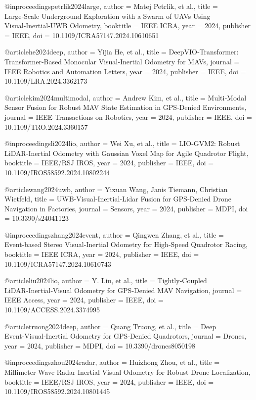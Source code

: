 @inproceedings{petrlik2024large,
  author = {Matej Petrlík, et al.},
  title = {Large‑Scale Underground Exploration with a Swarm of UAVs Using Visual‑Inertial‑UWB Odometry},
  booktitle = {IEEE ICRA},
  year = {2024},
  publisher = {IEEE},
  doi = {10.1109/ICRA57147.2024.10610651}
}

@article{he2024deep,
  author = {Yijia He, et al.},
  title = {DeepVIO‑Transformer: Transformer‑Based Monocular Visual‑Inertial Odometry for MAVs},
  journal = {IEEE Robotics and Automation Letters},
  year = {2024},
  publisher = {IEEE},
  doi = {10.1109/LRA.2024.3362173}
}

@article{kim2024multimodal,
  author = {Andrew Kim, et al.},
  title = {Multi‑Modal Sensor Fusion for Robust MAV State Estimation in GPS‑Denied Environments},
  journal = {IEEE Transactions on Robotics},
  year = {2024},
  publisher = {IEEE},
  doi = {10.1109/TRO.2024.3360157}
}

@inproceedings{li2024lio,
  author = {Wei Xu, et al.},
  title = {LIO‑GVM2: Robust LiDAR‑Inertial Odometry with Gaussian Voxel Map for Agile Quadrotor Flight},
  booktitle = {IEEE/RSJ IROS},
  year = {2024},
  publisher = {IEEE},
  doi = {10.1109/IROS58592.2024.10802244}
}

@article{wang2024uwb,
  author = {Yixuan Wang, Janis Tiemann, Christian Wietfeld},
  title = {UWB‑Visual‑Inertial‑Lidar Fusion for GPS‑Denied Drone Navigation in Factories},
  journal = {Sensors},
  year = {2024},
  publisher = {MDPI},
  doi = {10.3390/s24041123}
}

@inproceedings{zhang2024event,
  author = {Qingwen Zhang, et al.},
  title = {Event‑based Stereo Visual‑Inertial Odometry for High‑Speed Quadrotor Racing},
  booktitle = {IEEE ICRA},
  year = {2024},
  publisher = {IEEE},
  doi = {10.1109/ICRA57147.2024.10610743}
}

@article{liu2024lio,
  author = {Y. Liu, et al.},
  title = {Tightly‑Coupled LiDAR‑Inertial‑Visual Odometry for GPS‑Denied MAV Navigation},
  journal = {IEEE Access},
  year = {2024},
  publisher = {IEEE},
  doi = {10.1109/ACCESS.2024.3374995}
}

@article{truong2024deep,
  author = {Quang Truong, et al.},
  title = {Deep Event‑Visual‑Inertial Odometry for GPS‑Denied Quadrotors},
  journal = {Drones},
  year = {2024},
  publisher = {MDPI},
  doi = {10.3390/drones8050198}
}

@inproceedings{zhou2024radar,
  author = {Huizhong Zhou, et al.},
  title = {Millimeter‑Wave Radar‑Inertial‑Visual Odometry for Robust Drone Localization},
  booktitle = {IEEE/RSJ IROS},
  year = {2024},
  publisher = {IEEE},
  doi = {10.1109/IROS58592.2024.10801445}
}

